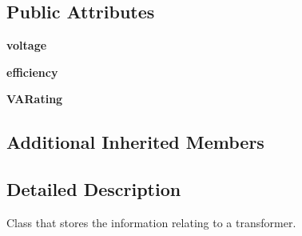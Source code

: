 \subsection*{Public Attributes}
\begin{DoxyCompactItemize}
\item 
\hypertarget{class_solar_calculator_1_1_assets_1_1_transformer_a4c12d4633850523d736f0d8ec14f5eb0}{{\bfseries voltage}}\label{class_solar_calculator_1_1_assets_1_1_transformer_a4c12d4633850523d736f0d8ec14f5eb0}

\item 
\hypertarget{class_solar_calculator_1_1_assets_1_1_transformer_ad5b3abd3f0bd80561660e7feb4499185}{{\bfseries efficiency}}\label{class_solar_calculator_1_1_assets_1_1_transformer_ad5b3abd3f0bd80561660e7feb4499185}

\item 
\hypertarget{class_solar_calculator_1_1_assets_1_1_transformer_a7d91d40f337c0633d1f0284d26506ee0}{{\bfseries V\-A\-Rating}}\label{class_solar_calculator_1_1_assets_1_1_transformer_a7d91d40f337c0633d1f0284d26506ee0}

\end{DoxyCompactItemize}
\subsection*{Additional Inherited Members}


\subsection{Detailed Description}
\begin{DoxyVerb}Class that stores the information relating to a transformer. \end{DoxyVerb}
 

